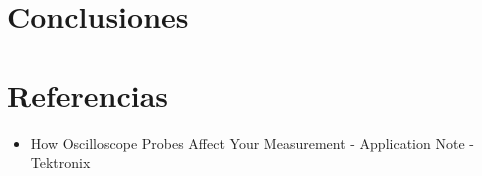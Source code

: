 \begin{multicols}{2}
        \section{Conclusiones}

        \section{Referencias} %
        \begin{itemize}
            \item How Oscilloscope Probes Affect Your Measurement - Application Note - Tektronix
        \end{itemize}

    \end{multicols}

